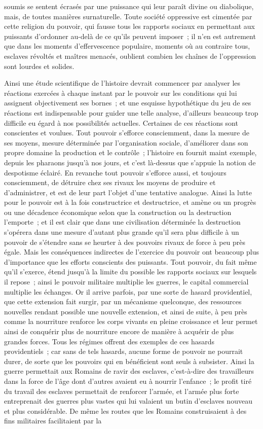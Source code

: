 \documentclass[french,twoside]{book} %
\begin{document}
soumis se sentent écrasés par une puissance qui leur paraît divine ou diabolique, mais, de toutes manières surnaturelle. Toute société oppressive est cimentée par cette religion du pouvoir, qui fausse tous les rapports sociaux en permettant aux puissants d'ordonner au-delà de ce qu'ils peuvent imposer ; il n'en est autrement que dans les moments d'effervescence populaire, moments où au contraire tous, esclaves révoltés et maîtres menacés, oublient combien les chaînes de l'oppression sont lourdes et solides.\par
Ainsi une étude scientifique de l'histoire devrait commencer par analyser les réactions exercées à chaque instant par le pouvoir sur les conditions qui lui assignent objectivement ses bornes ; et une esquisse hypothétique du jeu de ses réactions est indispensable pour guider une telle analyse, d'ailleurs beaucoup trop difficile eu égard à nos possibilités actuelles. Certaines de ces réactions sont conscientes et voulues. Tout pouvoir s'efforce consciemment, dans la mesure de ses moyens, mesure déterminée par l'organisation sociale, d'améliorer dans son propre domaine la production et le contrôle ; l'histoire en fournit maint exemple, depuis les pharaons jusqu'à nos jours, et c'est là-dessus que s'appuie la notion de despotisme éclairé. En revanche tout pouvoir s'efforce aussi, et toujours consciemment, de détruire chez ses rivaux les moyens de produire et d'administrer, et est de leur part l'objet d'une tentative analogue. Ainsi la lutte pour le pouvoir est à la fois constructrice et destructrice, et amène ou un progrès ou une décadence économique selon que la construction ou la destruction l'emporte ; et il est clair que dans une civilisation déterminée la destruction s'opérera dans une mesure d'autant plus grande qu'il sera plus difficile à un pouvoir de s'étendre sans se heurter à des pouvoirs rivaux de force à peu près égale. Mais les conséquences indirectes de l'exercice du pouvoir ont beaucoup plus d'importance que les efforts conscients des puissants. Tout pouvoir, du fait même qu'il s'exerce, étend jusqu'à la limite du possible les rapports sociaux sur lesquels il repose ; ainsi le pouvoir militaire multiplie les guerres, le capital commercial multiplie les échanges. Or il arrive parfois, par une sorte de hasard providentiel, que cette extension fait surgir, par un mécanisme quelconque, des ressources nouvelles rendant possible une nouvelle extension, et ainsi de suite, à peu près comme la nourriture renforce les corps vivants en pleine croissance et leur permet ainsi de conquérir plus de nourriture encore de manière à acquérir de plus grandes forces. Tous les régimes offrent des exemples de ces hasards providentiels ; car sans de tels hasards, aucune forme de pouvoir ne pourrait durer, de sorte que les pouvoirs qui en bénéficient sont seuls à subsister. Ainsi la guerre permettait aux Romains de ravir des esclaves, c'est-à-dire des travailleurs dans la force de l'âge dont d'autres avaient eu à nourrir l'enfance ; le profit tiré du travail des esclaves permettait de renforcer l'armée, et l'armée plus forte entreprenait des guerres plus vastes qui lui valaient un butin d'esclaves nouveau et plus considérable. De même les routes que les Romains construisaient à des fins militaires facilitaient par la 
\end{document}
